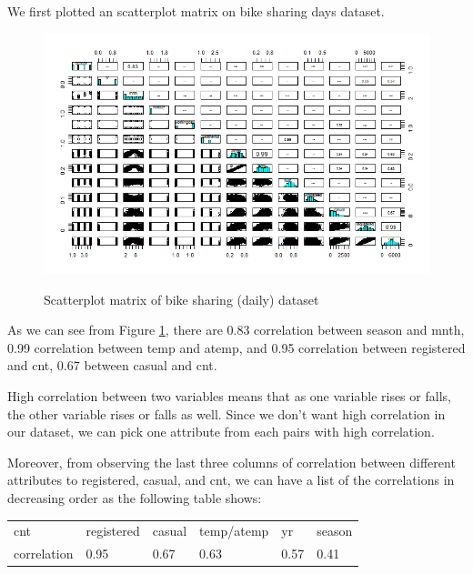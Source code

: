 \documentclass[12pt]{article}
\begin{document}
	We first plotted an scatterplot matrix on bike sharing days dataset.
	\begin{figure}[H]
		\includegraphics[scale=0.6]{figures/scatterplot.png}
		\label{fig:scatterplot}
		\caption{Scatterplot matrix of bike sharing (daily) dataset}
	\end{figure}
	
	As we can see from Figure \ref{fig:scatterplot}, there are 0.83 correlation between season and mnth, 0.99 correlation between temp and atemp, and 0.95 correlation between registered and cnt, 0.67 between casual and cnt.
	
	High correlation between two variables means that as one variable rises or falls, the other variable rises or falls as well. Since we don't want high correlation in our dataset, we can pick one attribute from each pairs with high correlation.
	
		Moreover, from observing the last three columns of correlation between different attributes to registered, casual, and cnt, we can have a list of the correlations in decreasing order as the following table shows: 
		\begin{table}[H]
			\begin{tabular}{| l | l | l | l | l | l|}
				cnt~ & registered & casual & temp/atemp & yr & season\\
				correlation & 0.95 & 0.67 & 0.63 & 0.57 & 0.41\\
				\hline
			\end{tabular}
		\end{table}
		
\end{document}
